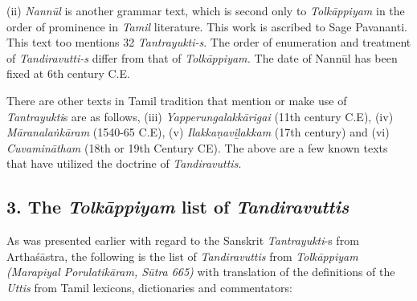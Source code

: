 (ii) \textit{Nannūl} is another grammar text, which is second only to \textit{Tolkāppiyam} in the order of prominence in \textit{Tamil} literature. This work is ascribed to Sage Pavananti. This text too mentions 32 \textit{Tantrayukti-s}. The order of enumeration and treatment of \textit{Tandiravutti-s } differ from that of \textit{Tolkāppiyam.} The date of Nannūl has been fixed at 6th century C.E.

There are other texts in Tamil tradition that mention or make use of \textit{Tantrayukti}s are as follows, (iii) \textit{Yapperungalakkārigai} (11th century C.E), (iv) \textit{Māranalaṅkāram} (1540-65 C.E), (v) \textit{Ilakkaṇaviḻakkam} (17th century) and (vi) \textit{Cuvaminātham} (18th or 19th Century CE). The above are a few known texts that have utilized the doctrine of \textit{Tandiravuttis}.


\subsection*{3. The \textit{Tolkāppiyam} list of \textit{Tandiravuttis}}

As was presented earlier with regard to the Sanskrit \textit{Tantrayukti}-s from Arthaśāstra, the following is the list of \textit{Tandiravuttis} from \textit{Tolkāppiyam (Marapiyal Porulatikāram, Sūtra 665)} with translation of the definitions of the \textit{Uttis} from Tamil lexicons, dictionaries and commentators:

